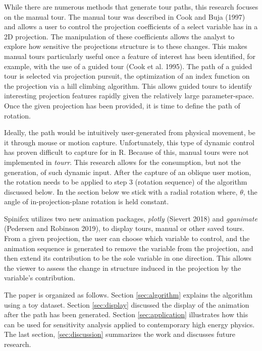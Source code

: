 While there are numerous methods that generate tour paths, this research focuses on the manual tour. The manual tour was described in Cook and Buja (1997) and allows a user to control the projection coefficients of a select variable has in a 2D projection. The manipulation of these coefficients allows the analyst to explore how sensitive the projections structure is to these changes. This makes manual tours particularly useful once a feature of interest has been identified, for example, with the use of a guided tour (Cook et al. 1995). The path of a guided tour is selected via projection pursuit, the optimization of an index function on the projection via a hill climbing algorithm. This allows guided tours to identify interesting projection features rapidly given the relatively large parameter-space. Once the given projection has been provided, it is time to define the path of rotation.

Ideally, the path would be intuitively user-generated from physical movement, be it through mouse or motion capture. Unfortunately, this type of dynamic control has proven difficult to capture for in R. Because of this, manual tours were not implemented in \emph{tourr}. This research allows for the consumption, but not the generation, of such dynamic input. After the capture of an oblique user motion, the rotation needs to be applied to step 3 (rotation sequence) of the algorithm discussed below. In the section below we stick with a radial rotation where, \(\theta\), the angle of in-projection-plane rotation is held constant.

Spinifex utilizes two new animation packages, \emph{plotly} (Sievert 2018) and \emph{gganimate} (Pedersen and Robinson 2019), to display tours, manual or other saved tours. From a given projection, the user can choose which variable to control, and the animation sequence is generated to remove the variable from the projection, and then extend its contribution to be the sole variable in one direction. This allows the viewer to assess the change in structure induced in the projection by the variable's contribution.

The paper is organized as follows. Section \ref{sec:algorithm} explains the algorithm using a toy dataset. Section \ref{sec:display} discussed the display of the animation after the path has been generated. Section \ref{sec:application} illustrates how this can be used for sensitivity analysis applied to contemporary high energy physics. The last section, \ref{sec:discussion} summarizes the work and discusses future research.

